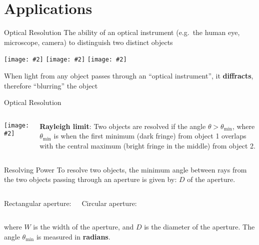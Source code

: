 \documentclass[compress,aspectratio=169]{beamer}
\newcommand{\pic}[2]{\texttt{[image: \#2]}}
\newcommand{\eq}[2]{\vspace{#1}{\LARGE\begin{displaymath}#2\end{displaymath}}}
\begin{document}
\section{Applications}

\begin{frame}{Optical Resolution}
  The ability of an optical instrument (e.g.\ the human eye, microscope,
  camera) to distinguish two distinct objects
  \begin{center}
    \pic{.322}{graphics/resolve1.png}\hspace{.05in}
    \pic{.322}{graphics/resolve2.png}\hspace{.05in}
    \pic{.322}{graphics/resolve3.png}\hspace{.05in}
  \end{center}
  When light from any object passes through an ``optical instrument'', it
  \textbf{diffracts}, therefore ``blurring'' the object
\end{frame}



\begin{frame}{Optical Resolution}
  \begin{columns}
    \pic{1}{graphics/resolve4.png}

    \textbf{Rayleigh limit}: Two objects are resolved if the angle
      $\theta>\theta_\mathrm{min}$, where $\theta_\mathrm{min}$ is when the first
      minimum (dark fringe) from object 1 overlaps with the central maximum
      (bright fringe in the middle) from object 2.
  \end{columns}
\end{frame}


\begin{frame}{Resolving Power}
  To resolve two objects, the minimum angle between rays from the two objects
  passing through an aperture is given by:
  $D$ of the aperture.
  \vspace{0.2in}
  \begin{columns}
    Rectangular aperture:

    \eq{-.2in}{
      \boxed{\theta_\mathrm{min}=\frac{\lambda}{W}}
    }
    Circular aperture:

    \eq{-.2in}{
      \boxed{\theta_\mathrm{min}=\frac{1.22\lambda}{D}}
    }
  \end{columns}
  where $W$ is the width of the aperture, and $D$ is the diameter of the
  aperture. The angle $\theta_\mathrm{min}$ is measured in \textbf{radians}.
\end{frame}
\end{document}
